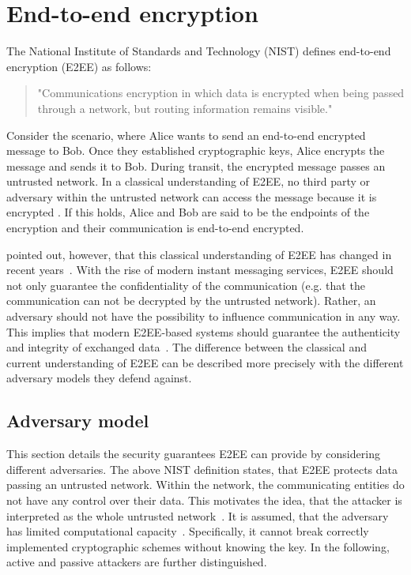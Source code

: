 \documentclass[../main.tex]{subfiles}
\begin{document}
\section{End-to-end encryption} 
\label{sec:end-to-end}

The National Institute of Standards and Technology (NIST) defines end-to-end encryption (E2EE) as follows:
\begin{quote}
"Communications encryption in which data is encrypted when being passed through a network, but routing information remains visible."~\cite[88]{Nieles2017}
\end{quote}
Consider the scenario, where Alice wants to send an end-to-end encrypted message to Bob.
Once they established cryptographic keys, Alice encrypts the message and sends it to Bob.
During transit, the encrypted message passes an untrusted network.
In a classical understanding of E2EE, no third party or adversary within the untrusted network can access the message because it is encrypted \cite{Ermoshina2016}.
If this holds, Alice and Bob are said to be the endpoints of the encryption and their communication is end-to-end encrypted.

\citeauthor{Hale2022} pointed out, however, that this classical understanding of E2EE has changed in recent years~\cite{Hale2022}. 
With the rise of modern instant messaging services, E2EE should not only guarantee the confidentiality of the communication (e.g. that the communication can not be decrypted by the untrusted network).
Rather, an adversary should not have the possibility to influence communication in any way.
This implies that modern E2EE-based systems should guarantee the authenticity and integrity of exchanged data~\cite{Hale2022}. 
The difference between the classical and current understanding of E2EE can be described more precisely with the different adversary models they defend against.

\subsection{Adversary model}
This section details the security guarantees E2EE can provide by considering different adversaries.
The above NIST definition states, that E2EE protects data passing an untrusted network.
Within the network, the communicating entities do not have any control over their data.
This motivates the idea, that the attacker is interpreted as the whole untrusted network~\cite{Nabeel2017}.
It is assumed, that the adversary has limited computational capacity~\cite{Katz2020}. 
Specifically, it cannot break correctly implemented cryptographic schemes without knowing the key.
In the following, active and passive attackers are further distinguished. 
\end{document}
